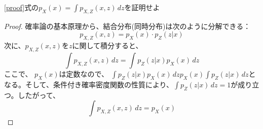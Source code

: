 \documentclass[a4paper]{jsarticle}%
\begin{document}
\begin{exercise}
  \eqref{proof}式の$p_X \left(x\right)=\int p_{X,Z}(x, z) \, dz$を証明せよ
\end{exercise}

\begin{proof}
確率論の基本原理から、結合分布(同時分布)は次のように分解できる：
\[
  p_{X,Z}(x, z) = p_X(x) \cdot p_{Z}(z|x)
\]
次に、$p_{X,Z}(x, z)$を$z$に関して積分すると、
\[
  \int p_{X,Z}(x,z) \, dz = \int p_{Z}(z|x) p_X(x) \, dz
\]
ここで、 $ p_X \left(x\right) $は定数なので、 $ \int p_{Z}(z|x) p_X(x) \, dzp_X \left(x\right)\int p_Z \left(z|x\right)\, dz $となる。そして、条件付き確率密度関数の性質により、$ \int p_Z \left(z|x\right)\, dz = 1 $が成り立つ。したがって、
$$ \int p_{X,Z}(x,z) \, dz = p_X \left(x\right) $$
\end{proof}
\end{document}
